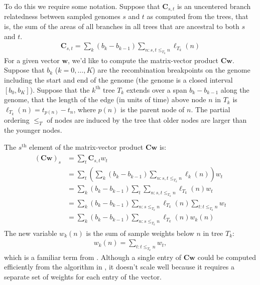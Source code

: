 To do this we require some notation.
Suppose that $\mathbf{C}_{s,t}$ is an uncentered branch relatedness between
sampled genomes $s$ and $t$ as computed from the trees, that is,
the sum of the areas of all branches in all trees that are ancestral to both $s$ and $t$.
\begin{align} \label{defn:pairwise_relatedness}
    \mathbf{C}_{s,t} = \sum_k (b_k - b_{k-1}) \sum_{n: s,t \le_{T_k} n} \ell_{T_k}(n) %
\end{align}
For a given vector $\mathbf{w}$, we'd like to compute the matrix-vector product $\mathbf{C}\mathbf{w}$.
Suppose that $b_k$ ($k=0,\ldots,K$) are the recombination breakpoints on the genome
including the start and end of the genome (the genome is a closed interval $[b_0, b_K]$).
Suppose that the $k^{\text{th}}$ tree $T_k$ extends over a span $b_k - b_{k-1}$ along the genome,
that the length of the edge (in units of time) above node $n$ in $T_k$ is $\ell_{T_k}(n) = t_{p(n)}-t_n$,
where $p(n)$ is the parent node of $n$.
The partial ordering $\le_T$ of nodes are induced by the tree that older nodes are larger than the younger nodes.

The $s^{\text{th}}$ element of the matrix-vector product $\mathbf{C}\mathbf{w}$ is:
\begin{align} \label{eq:similar_ralph2020}
    \begin{aligned}
        (\mathbf{C}\mathbf{w})_s &=
        \sum_t \mathbf{C}_{s,t} w_t \\
        &=
        \sum_t
        \left(
            \sum_k (b_k - b_{k-1}) \sum_{n: s,t \le_{T_k} n} \ell_k(n)
        \right) {w}_t \\
        &=
        \sum_k (b_k - b_{k-1})
        \sum_t
        \sum_{n: s,t \le_{T_k} n} \ell_{T_k}(n) {w}_t \\
        &=
        \sum_k (b_k - b_{k-1})
        \sum_{n: s\le_{T_k} n} \ell_{T_k}(n)
        \sum_{t:t \le_{T_k} n} {w}_t \\
        &=
        \sum_k (b_k - b_{k-1})
        \sum_{n: s\le_{T_k} n} \ell_{T_k}(n) w_k(n)
    \end{aligned}
\end{align}
The new variable $w_k(n)$ is the sum of sample weights below $n$ in tree $T_k$:
\begin{align}
    w_k(n) = \sum_{t:t \le_{T_k} n} {w}_t ,
\end{align}
which is a familiar term from \citet{ralph2020efficiently}.
Although a single entry of $\mathbf{C}\mathbf{w}$ could be computed efficiently
from the algorithm in \citet{ralph2020efficiently},
it doesn't scale well because it requires a separate set of weights for 
each entry of the vector.

